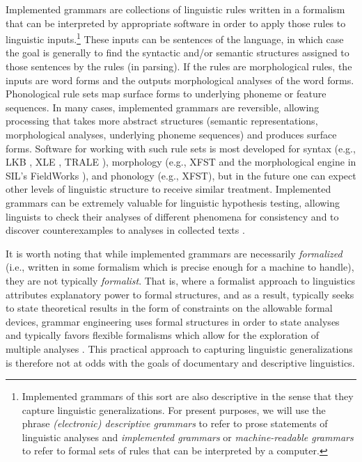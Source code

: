 \documentclass[12pt]{article}
\begin{document}
Implemented grammars are collections of linguistic rules written in a
formalism that can be interpreted by appropriate software in order to
apply those rules to linguistic inputs.\footnote{Implemented grammars
  of this sort are also descriptive in the sense that they capture
  linguistic generalizations.  For present purposes, we will use the
  phrase {\it (electronic) descriptive grammars} to refer to prose
  statements of linguistic analyses and {\it implemented grammars} or
  {\it machine-readable grammars} to refer to formal sets of rules
  that can be interpreted by a computer.}  These inputs can be sentences of
the language, in which case the goal is generally to find the
syntactic and/or semantic structures assigned to those sentences by
the rules (in parsing).  If the rules are morphological rules, the
inputs are word forms and the outputs morphological analyses of the
word forms.  Phonological rule sets map surface forms to underlying
phoneme or feature sequences.  In many cases, implemented grammars are
reversible, allowing processing that takes more abstract structures
(semantic representations, morphological analyses, underlying phoneme
sequences) and produces surface forms.  Software for working with such
rule sets is most developed for syntax (e.g., LKB \cite{Copestake:02},
XLE \cite{xle}, TRALE \cite{Meu:Pen:Ric:02}), morphology (e.g., XFST
\cite{Bee:Kar:03} and the morphological engine in SIL's FieldWorks
\cite{Bla:Sim:08}), and phonology (e.g., XFST), but in the future one
can expect other levels of linguistic structure to receive similar
treatment.  Implemented grammars can be extremely valuable for
linguistic hypothesis testing, allowing linguists to check their
analyses of different phenomena for consistency
\cite{Bierwisch:63,Mueller:99,Bender:08,Ben:Fli:Oep:11} and to
discover counterexamples to analyses in collected texts
\cite{Bal:Bea:Ben:Fli:Kim:Oep:05}.

It is worth noting that while implemented grammars are necessarily
{\it formalized} (i.e., written in some formalism which is precise
enough for a machine to handle), they are not typically {\it
  formalist}.  That is, where a formalist approach to linguistics
attributes explanatory power to formal structures, and as a result,
typically seeks to state theoretical results in the form of
constraints on the allowable formal devices, grammar engineering uses
formal structures in order to state analyses and typically favors
flexible formalisms which allow for the exploration of multiple
analyses \cite{Ben:Fli:Oep:11}.  This practical approach to capturing
linguistic generalizations is therefore not at odds with the goals of
documentary and descriptive linguistics.
\end{document}
